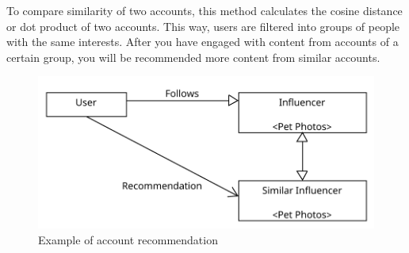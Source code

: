 To compare similarity of two accounts, this method calculates the cosine distance or dot product of two accounts. \cite{ig-explore} This way, users are filtered into groups of people with the same interests. After you have engaged with content from accounts of a certain group, you will be recommended more content from similar accounts. 


\begin{figure}[H]
    \centering
    \includegraphics[width=1\linewidth]{Diagrams/collaborative-filtering.pdf}
    \caption{Example of account recommendation}
    \label{fig:collaborative-filtering-diagram}
\end{figure}
